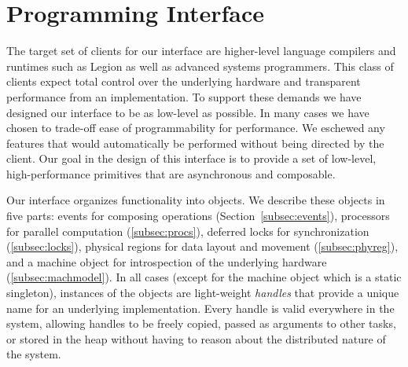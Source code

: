 
\section{Programming Interface}
\label{sec:interface}
The target set of clients for our interface are higher-level language
compilers and runtimes such as Legion\cite{Legion12} as well as 
advanced systems programmers.  This class of clients expect total control
over the underlying hardware and transparent performance from an
implementation.  To support these demands we have designed our interface
to be as low-level as possible.  In many cases we have chosen to trade-off
ease of programmability for performance.  We eschewed any features that would
automatically be performed without being directed by the client.
Our goal in the design of this interface is to provide a set of low-level,
high-performance primitives that are asynchronous and composable.

Our interface organizes functionality into objects.  We describe
these objects in five parts: events for composing operations 
(Section~\ref{subsec:events}), processors for parallel computation 
(\ref{subsec:procs}), deferred locks for synchronization
(\ref{subsec:locks}), physical regions for data layout and movement
(\ref{subsec:phyreg}), and a machine object for introspection of the underlying
hardware (\ref{subsec:machmodel}).  In all cases (except for the
machine object which is a static singleton), instances of the objects
are light-weight {\em handles} that provide a unique name for an underlying
implementation.
Every handle is valid everywhere in the system, allowing handles to be freely copied,
passed as arguments to other tasks, or stored in the heap
without having to reason about the distributed nature of the system.


